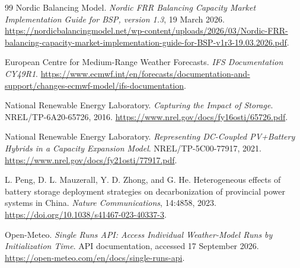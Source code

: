 \documentclass[11pt,a4paper]{article}
\begin{document}
\begin{thebibliography}{99}
Nordic Balancing Model.
\newblock \emph{Nordic FRR Balancing Capacity Market Implementation Guide for
BSP, version 1.3}, 19 March 2026.
\newblock \url{https://nordicbalancingmodel.net/wp-content/uploads/2026/03/Nordic-FRR-balancing-capacity-market-implementation-guide-for-BSP-v1r3-19.03.2026.pdf}.

European Centre for Medium-Range Weather Forecasts.
\newblock \emph{IFS Documentation CY49R1}.
\newblock \url{https://www.ecmwf.int/en/forecasts/documentation-and-support/changes-ecmwf-model/ifs-documentation}.

National Renewable Energy Laboratory.
\newblock \emph{Capturing the Impact of Storage}.
\newblock NREL/TP-6A20-65726, 2016.
\newblock \url{https://www.nrel.gov/docs/fy16osti/65726.pdf}.

National Renewable Energy Laboratory.
\newblock \emph{Representing DC-Coupled PV+Battery Hybrids in a Capacity Expansion Model}.
\newblock NREL/TP-5C00-77917, 2021.
\newblock \url{https://www.nrel.gov/docs/fy21osti/77917.pdf}.

L. Peng, D. L. Mauzerall, Y. D. Zhong, and G. He.
\newblock Heterogeneous effects of battery storage deployment strategies on decarbonization of provincial power systems in China.
\newblock \emph{Nature Communications}, 14:4858, 2023.
\newblock \url{https://doi.org/10.1038/s41467-023-40337-3}.

Open-Meteo.
\newblock \emph{Single Runs API: Access Individual Weather-Model Runs by
Initialization Time}.
\newblock API documentation, accessed 17 September 2026.
\newblock \url{https://open-meteo.com/en/docs/single-runs-api}.

\end{thebibliography}
\end{document}
